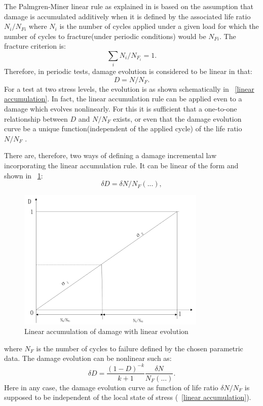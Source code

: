 \documentclass[3p,times,procedia,number]{elsarticle}
\newcommand{\figref}[1]{\figurename~\ref{#1}}
\begin{document}
The Palmgren-Miner linear rule as explained in \cite{lemaitre1990mechanics} is based on the assumption that damage is accumulated additively when it is defined by the associated life ratio $N_i/N_{Fi}$ where $N_i$ is the number of cycles applied under a given load for which the number of cycles to fracture(under periodic conditions) would be $N_{Fi}$. The fracture criterion is:
$$\sum_{i}N_i/N_{F_i}=1.$$
Therefore, in periodic tests, damage evolution is considered to be linear in that:
$$D=N/N_F.$$
For a test at two stress levels, the evolution is as shown schematically in \figref{linear accumulation}. In fact, the linear accumulation rule can be applied even to a damage which evolves nonlinearly. For this it is sufficient that a one-to-one relationship between $D$ and $N/N_F$ exists, or even that the damage evolution curve be a unique function(independent of the applied cycle) of the life ratio $N/N_F$ . 

There are, therefore, two ways of defining a damage incremental law incorporating the linear accumulation rule. It can be linear of the form and shown in \figref{linearevolution}:
$$\delta D= \delta N/N_F(...),$$
\begin{figure}[h!]
	\centering
	\includegraphics[width=0.8\textwidth]{figures//linearevolution.png} 
	\caption{Linear accumulation of damage with linear evolution}
	\label{linearevolution}
\end{figure}
where $N_F$ is the number of cycles to failure defined by the chosen parametric data.
The damage evolution can be nonlinear such as:
$$\delta D= \frac{(1-D)^{-k}}{k+1}\frac{\delta N}{N_F(...)}.$$
Here in any case, the damage evolution curve as function of life ratio $\delta N/N_F$ is supposed to be independent of the local state of stress (\figref{linear accumulation}).
\end{document}
